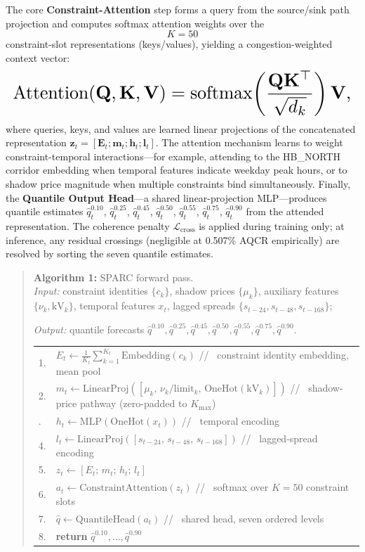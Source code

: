 \documentclass[twoside]{article}
\begin{document}
The core \textbf{Constraint-Attention} step forms a query from the source/sink path projection and computes softmax attention weights over the $$K{=}50$$ constraint-slot representations (keys/values), yielding a congestion-weighted context vector:
\[
\resizebox{\columnwidth}{!}{$\displaystyle \text{Attention}(\mathbf{Q}, \mathbf{K}, \mathbf{V}) = \text{softmax}\!\left(\frac{\mathbf{Q}\mathbf{K}^\top}{\sqrt{d_k}}\right)\mathbf{V},$}
\]
where queries, keys, and values are learned linear projections of the concatenated representation $\mathbf{z}_t = [\mathbf{E}_t; \mathbf{m}_t; \mathbf{h}_t; \mathbf{l}_t]$. The attention mechanism learns to weight constraint-temporal interactions---for example, attending to the HB\_NORTH corridor embedding when temporal features indicate weekday peak hours, or to shadow price magnitude when multiple constraints bind simultaneously.
Finally, the \textbf{Quantile Output Head}---a shared linear-projection MLP---produces quantile estimates $\hat{q}_t^{0.10}$, $\hat{q}_t^{0.25}$, $\hat{q}_t^{0.45}$, $\hat{q}_t^{0.50}$, $\hat{q}_t^{0.55}$, $\hat{q}_t^{0.75}$, $\hat{q}_t^{0.90}$ from the attended representation. The coherence penalty $\mathcal{L}_{\text{cross}}$ is applied during training only; at inference, any residual crossings (negligible at 0.507\% AQCR empirically) are resolved by sorting the seven quantile estimates.
\begin{quote}\small
\setlength{\parindent}{0pt}
\textbf{Algorithm 1:} SPARC forward pass.\\[2pt]
{\emph{Input:}} constraint identities $\{c_k\}$, shadow prices $\{\mu_k\}$, auxiliary features $\{\nu_k, \mathrm{kV}_k\}$, temporal features $x_t$, lagged spreads $\{s_{t-24}, s_{t-48}, s_{t-168}\}$;\par
{\emph{Output:}} quantile forecasts $\hat{q}^{0.10}, \hat{q}^{0.25}, \hat{q}^{0.45}, \hat{q}^{0.50}, \hat{q}^{0.55}, \hat{q}^{0.75}, \hat{q}^{0.90}$.\par\vspace{2pt}
\begin{tabular}{@{}l p{2.5in}@{}}
1. & $E_t \leftarrow \frac{1}{K_t} \sum_{k=1}^{K_t} \mathrm{Embedding}(c_k)$ \; // \, constraint identity embedding, mean pool\\
2. & $m_t \leftarrow \mathrm{LinearProj}([\mu_k,\, \nu_k/\mathrm{limit}_k,\, \mathrm{OneHot}(\mathrm{kV}_k)])$ \; // \, shadow-price pathway (zero-padded to $K_{\max}$)\\\n3. & $h_t \leftarrow \mathrm{MLP}( \mathrm{OneHot}(x_t) )$ \; // \, temporal encoding\\
4. & $l_t \leftarrow \mathrm{LinearProj}( [s_{t-24},\, s_{t-48},\, s_{t-168}] )$ \; // \, lagged-spread encoding\\
5. & $z_t \leftarrow [E_t;\, m_t;\, h_t;\, l_t]$\\
6. & $a_t \leftarrow \mathrm{ConstraintAttention}(z_t)$ \; // \, softmax over $K{=}50$ constraint slots\\
7. & $\hat{q} \leftarrow \mathrm{QuantileHead}(a_t)$ \; // \, shared head, seven ordered levels\\
8. & \textbf{return} $\hat{q}^{0.10}, \ldots, \hat{q}^{0.90}$\\
\end{tabular}
\end{quote}
\end{document}
